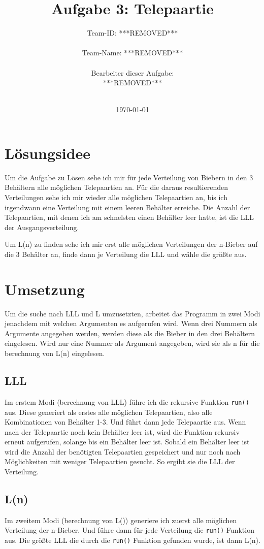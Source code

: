 \documentclass[a4paper,10pt]{scrartcl}
\title{Aufgabe 3: Telepaartie}
\author{Team-ID: ***REMOVED*** \\\\
	    Team-Name: ***REMOVED*** \\\\
	    Bearbeiter dieser Aufgabe: \\
	    ***REMOVED***\\\\}
\date{\today}
\begin{document}
\maketitle
\tableofcontents

\section{Lösungsidee}
Um die Aufgabe zu Lösen sehe ich mir für jede Verteilung von Biebern in den 3 Behältern alle möglichen Telepaartien an. Für die daraus resultierenden Verteilungen sehe ich mir wieder alle möglichen Telepaartien an, bis ich irgendwann eine Verteilung mit einem leeren Behälter erreiche. Die Anzahl der Telepaartien, mit denen ich am schnelsten einen Behälter leer hatte, ist die LLL der Ausgangsverteilung.

Um L(n) zu finden sehe ich mir erst alle möglichen Verteilungen der n-Bieber auf die 3 Behälter an, finde dann je Verteilung die LLL und wähle die größte aus.

\section{Umsetzung}
Um die suche nach LLL und L umzusetzten, arbeitet das Programm in zwei Modi jenachdem mit welchen Argumenten es aufgerufen wird. Wenn drei Nummern als Argumente angegeben werden, werden diese als die Bieber in den drei Behältern eingelesen. Wird nur eine Nummer als Argument angegeben, wird sie als n für die berechnung von L(n) eingelesen.

\subsection{LLL}
Im erstem Modi (berechnung von LLL) führe ich die rekursive Funktion \lstinline|run()| aus. Diese generiert als erstes alle möglichen Telepaartien, also alle Kombinationen von Behälter 1-3. Und führt dann jede Telepaartie aus. Wenn nach der Telepaartie noch kein Behälter leer ist, wird die Funktion rekursiv erneut aufgerufen, solange bis ein Behälter leer ist. Sobald ein Behälter leer ist wird die Anzahl der benötigten Telepaartien gespeichert und nur noch nach Möglichkeiten mit weniger Telepaartien gesucht. So ergibt sie die LLL der Verteilung.

\subsection{L(n)}
Im zweitem Modi (berechnung von L()) generiere ich zuerst alle möglichen Verteilung der n-Bieber. Und führe dann für jede Verteilung die \lstinline|run()| Funktion aus. Die größte LLL die durch die \lstinline|run()| Funktion gefunden wurde, ist dann L(n).
\end{document}
